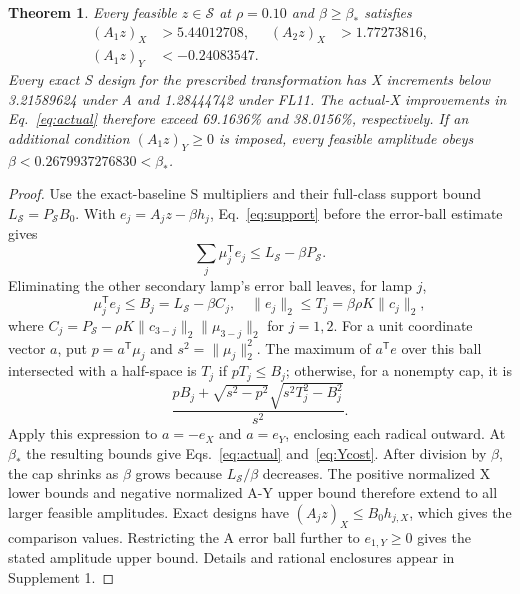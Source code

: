 \documentclass{optica-article}
\newtheorem{theorem}{Theorem}
\begin{document}
\begin{theorem}\label{thm:response}
Every feasible $z\in\mathcal S$ at $\rho=0.10$ and $\beta\geq\beta_*$ satisfies
\begin{align}
 (A_1z)_X&>5.44012708, & (A_2z)_X&>1.77273816,\label{eq:actual}\\
 (A_1z)_Y&<-0.24083547.\label{eq:Ycost}
\end{align}
Every exact S design for the prescribed transformation has X increments below 3.21589624 under A and 1.28444742 under FL11. The actual-X improvements in Eq.~\eqref{eq:actual} therefore exceed 69.1636\% and 38.0156\%, respectively. If an additional condition $(A_1z)_Y\geq0$ is imposed, every feasible amplitude obeys $\beta<0.2679937276830<\beta_*$.
\end{theorem}

\begin{proof}
Use the exact-baseline S multipliers and their full-class support bound $L_{\mathcal S}=P_{\mathcal S}B_0$. With $e_j=A_jz-\beta h_j$, Eq.~\eqref{eq:support} before the error-ball estimate gives
\begin{equation}
 \sum_j\mu_j^{\mathsf T}e_j\leq L_{\mathcal S}-\beta P_{\mathcal S}.
\end{equation}
Eliminating the other secondary lamp's error ball leaves, for lamp $j$,
\begin{equation}
 \mu_j^{\mathsf T}e_j\leq B_j=L_{\mathcal S}-\beta C_j,
 \quad\|e_j\|_2\leq T_j=\beta\rho K\|c_j\|_2,
 \label{eq:cap}
\end{equation}
where $C_j=P_{\mathcal S}-\rho K\|c_{3-j}\|_2\|\mu_{3-j}\|_2$ for $j=1,2$. For a unit coordinate vector $a$, put $p=a^{\mathsf T}\mu_j$ and $s^2=\|\mu_j\|_2^2$. The maximum of $a^{\mathsf T}e$ over this ball intersected with a half-space is $T_j$ if $pT_j\leq B_j$; otherwise, for a nonempty cap, it is
\begin{equation}
 \frac{pB_j+\sqrt{s^2-p^2}\sqrt{s^2T_j^2-B_j^2}}{s^2}.
 \label{eq:capformula}
\end{equation}
Apply this expression to $a=-e_X$ and $a=e_Y$, enclosing each radical outward. At $\beta_*$ the resulting bounds give Eqs.~\eqref{eq:actual} and~\eqref{eq:Ycost}. After division by $\beta$, the cap shrinks as $\beta$ grows because $L_{\mathcal S}/\beta$ decreases. The positive normalized X lower bounds and negative normalized A-Y upper bound therefore extend to all larger feasible amplitudes. Exact designs have $(A_jz)_X\leq B_0h_{j,X}$, which gives the comparison values. Restricting the A error ball further to $e_{1,Y}\geq0$ gives the stated amplitude upper bound. Details and rational enclosures appear in Supplement 1.
\end{proof}
\end{document}
